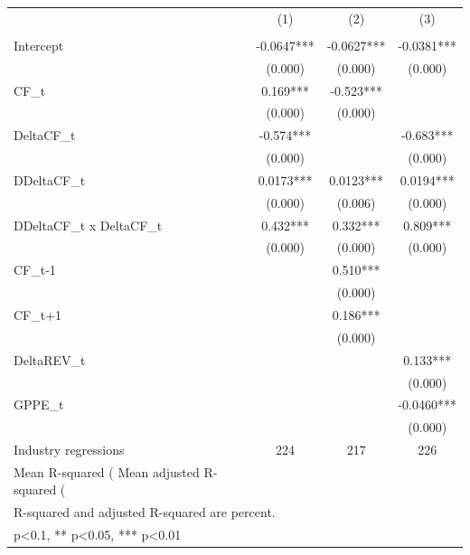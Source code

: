 {
\def\sym#1{\ifmmode^{#1}\else\(^{#1}\)\fi}
\begin{tabular}{l*{3}{c}}
\hline\hline
                    &\multicolumn{1}{c}{(1)}&\multicolumn{1}{c}{(2)}&\multicolumn{1}{c}{(3)}\\
                    &\multicolumn{1}{c}{}&\multicolumn{1}{c}{}&\multicolumn{1}{c}{}\\
\hline
Intercept           &     -0.0647***&     -0.0627***&     -0.0381***\\
                    &     (0.000)   &     (0.000)   &     (0.000)   \\
[1em]
CF\_t                &       0.169***&      -0.523***&               \\
                    &     (0.000)   &     (0.000)   &               \\
[1em]
DeltaCF\_t           &      -0.574***&               &      -0.683***\\
                    &     (0.000)   &               &     (0.000)   \\
[1em]
DDeltaCF\_t          &      0.0173***&      0.0123***&      0.0194***\\
                    &     (0.000)   &     (0.006)   &     (0.000)   \\
[1em]
DDeltaCF\_t x DeltaCF\_t&       0.432***&       0.332***&       0.809***\\
                    &     (0.000)   &     (0.000)   &     (0.000)   \\
[1em]
CF\_{t-1}            &               &       0.510***&               \\
                    &               &     (0.000)   &               \\
[1em]
CF\_{t+1}            &               &       0.186***&               \\
                    &               &     (0.000)   &               \\
[1em]
DeltaREV\_t          &               &               &       0.133***\\
                    &               &               &     (0.000)   \\
[1em]
GPPE\_t              &               &               &     -0.0460***\\
                    &               &               &     (0.000)   \\
\hline
Industry regressions&         224   &         217   &         226   \\
Mean R-squared (%
Mean adjusted R-squared (%
\hline\hline
\multicolumn{4}{l}{\footnotesize mean coefficients; p in parentheses}\\
\multicolumn{4}{l}{\footnotesize R-squared and adjusted R-squared are percent.}\\
\multicolumn{4}{l}{\footnotesize * p<0.1, ** p<0.05, *** p<0.01}\\
\end{tabular}
}
